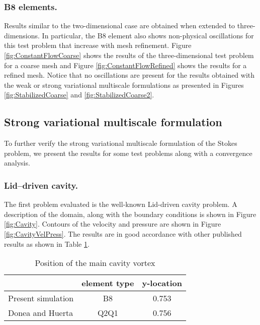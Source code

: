 \documentclass[11pt]{amsart}
\begin{document}
\subsubsection{B8 elements.}
Results similar to the two-dimensional case are obtained when extended to three-dimensions.  In particular, the B8 element also shows non-physical oscillations for this test problem that increase with mesh refinement.  Figure \ref{fig:ConstantFlowCoarse} shows the results of the three-dimensional test problem for a coarse mesh and Figure \ref{fig:ConstantFlowRefined} shows the results for a refined mesh.  Notice that no oscillations are present for the results obtained with the weak or strong variational multiscale  formulations as presented in Figures \ref{fig:StabilizedCoarse} and \ref{fig:StabilizedCoarse2}.
\subsection{Strong variational multiscale formulation}
To further verify the strong variational multiscale formulation of the Stokes problem, we present the results for some test problems along with a convergence analysis.  
\subsubsection{Lid--driven cavity.}
The first problem evaluated is the well-known Lid-driven cavity problem.  A description of the domain, along with the boundary conditions is shown in Figure \ref{fig:Cavity}.
Contours of the velocity and pressure are shown in Figure \ref{fig:CavityVelPress}.  The results are in good accordance with other published results as shown in Table \ref{table:VortexLocation}.
\begin{table}[htb]
\caption{Position of the main cavity vortex}
\centering
\begin{tabular}{l c c }
\hline
  & element type & y-location  \\ [0.5ex]
\hline
Present simulation  & B8 & 0.753    \\
Donea and Huerta\cite{Donea} & Q2Q1 & 0.756 \\
\hline
\end{tabular}
\label{table:VortexLocation}
\end{table}
\end{document}
